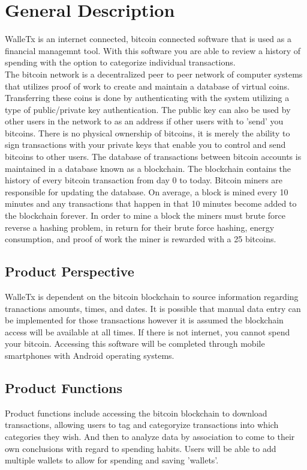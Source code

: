 \section{General Description}
  WalleTx is an internet connected, bitcoin connected software that is used as a financial managemnt tool. With this software you are able to review a history of spending with the option to categorize individual transactions.\\

  The bitcoin network is a decentralized peer to peer network of computer systems that utilizes proof of work to create and maintain a database of virtual coins. Transferring these coins is done by authenticating with the system utilizing a type of public/private key authentication. The public key can also be used by other users in the network to as an address if other users with to 'send' you bitcoins. There is no physical ownership of bitcoins, it is merely the ability to sign transactions with your private keys that enable you to control and send bitcoins to other users. The database of transactions between bitcoin accounts is maintained in a database known as a blockchain. The blockchain contains the history of every bitcoin transaction from day 0 to today. Bitcoin miners are responsible for updating the database. On average, a block is mined every 10 minutes and any transactions that happen in that 10 minutes become added to the blockchain forever. In order to mine a block the miners must brute force reverse a hashing problem, in return for their brute force hashing, energy consumption, and proof of work the miner is rewarded with a 25 bitcoins.
  \subsection{Product Perspective}
  WalleTx is dependent on the bitcoin blockchain to source information regarding tranactions amounts, times, and dates. It is possible that manual data entry can be implemented for those transactions however it is assumed the blockchain access will be available at all times. If there is not internet, you cannot spend your bitcoin. Accessing this software will be completed through mobile smartphones with Android operating systems.
  \subsection{Product Functions}
  Product functions include accessing the bitcoin blockchain to download transactions, allowing users to tag and categoryize transactions into which categories they wish. And then to analyze data by association to come to their own conclusions with regard to spending habits. Users will be able to add multiple wallets to allow for spending and saving 'wallets'. 

